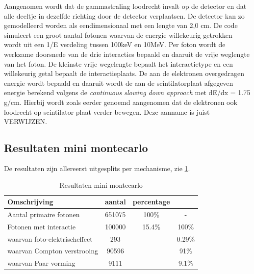 \documentclass[a4paper,11pt]{article}
\begin{document}
Aangenomen wordt dat de gammastraling loodrecht invalt op de detector en dat alle deeltje in dezelfde richting door de detector verplaatsen. De detector kan zo gemodelleerd worden als eendimensionaal met een lengte van 2,0 cm. De code simuleert een groot aantal fotonen waarvan de energie willekeurig getrokken wordt uit een 1/E verdeling tussen 100keV en 10MeV. Per foton wordt de werkzame doorsnede van de drie interacties bepaald en daaruit de vrije weglengte van het foton. De kleinste vrije wegelengte bepaalt het interactietype en een willekeurig getal bepaalt de interactieplaats. De aan de elektronen overgedragen energie wordt bepaald en daaruit wordt de aan de scintilatorplaat afgegeven energie berekend volgens de \textit{continuous slowing down approach} met dE/dx = 1.75 g/cm. Hierbij wordt zoals eerder genoemd aangenomen dat de elektronen ook loodrecht op scintilator plaat verder bewegen. Deze aanname is juist VERWIJZEN.

\subsection{Resultaten mini montecarlo}
De resultaten zijn allereerst uitgesplits per mechanisme, zie \ref{table:mmc-mechanisme}.
\begin{table}[ht]
\caption{Resultaten mini montecarlo}
\centering
\begin{tabular}{l c c c} %
\hline\hline
Omschrijving & aantal & percentage \\ [0.5ex] %
\hline %
Aantal primaire fotonen & 651075 & 100\% & - \\ %
Fotonen met interactie & 100000 & 15.4\% & 100\% \\
waarvan foto-elektrischeffect & 293 & & 0.29\% \\
waarvan Compton verstrooing & 90596 & & 91\% \\
waarvan Paar vorming & 9111 & & 9.1\% \\ [1ex] %
\hline %
\end{tabular}
\label{table:mmc-mechanisme} %
\end{table}
\end{document}
